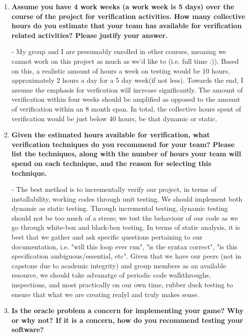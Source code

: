\documentclass[12pt,fleqn]{examtst}
\begin{document}
\begin{enumerate}
\item \textbf{Assume you have 4 work weeks (a work week is 5 days) over the
    course of the project for verification activities.  How many collective
    hours do you estimate that your team has available for verification related
    activities?  Please justify your answer.}

  - My group and I are presumably enrolled in other courses, meaning we cannot work on this project as much as we'd like to (i.e. full time :)). Based on this, a realistic amount of hours a week on testing would be 10 hours, approximately 2 hours a day for a 5 day week(if not less). Towards the end, I assume the emphasis for verfication will increase significantly. The amount of verification within four weeks should be amplified as opposed to the amount of verification within an 8 month span. In total, the collective hours spent of verification would be just below 40 hours, be that dynamic or static. 
  
\item \textbf{Given the estimated hours available for verification, what verification
    techniques do you recommend for your team?  Please list the techniques,
    along with the number of hours your team will spend on each technique, and
    the reason for selecting this technique.}

  - The best method is to incrementally verify our project, in terms of installability, working codes through unit testing. We should implement both dynamic as static testing. Through incremental testing, dynamic testing should not be too much of a stress; we test the behaviour of our code as we go through white-box and black-box testing. In terms of static analysis, it is best that we gather and ask specific questions pertaining to our documentation, i.e. "will this loop ever run", "is the syntax correct", "is this specification ambiguous/essential, etc". Given that we have our peers (not in capstone due to academic integrity) and group members as an available resource, we should take advanatge of periodic code walkthroughs, inspections, and most practically on our own time, rubber duck testing to ensure that what we are creating realyl and truly makes sense.
  
\item \textbf{Is the oracle problem a concern for implementing your game?  Why
    or why not?  If it is a concern, how do you recommend testing your software?}


\end{enumerate}
\end{document}
